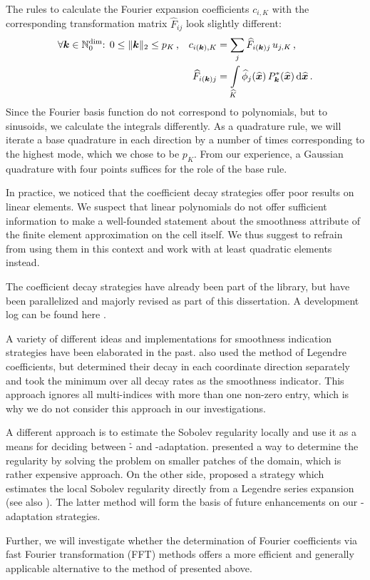 The rules to calculate the Fourier expansion coefficients $c_{i,K}$ with the corresponding transformation matrix $\widehat{F}_{ij}$ look slightly different:
\begin{align}
&\forall \tuple{k} \in \mathbb{N}_0^\text{dim} \text{: } 0 \leq \|\tuple{k}\|_2 \leq p_K \, \text{,} &
c_{i(\tuple{k}),K} &= \sum\limits_j \widehat{F}_{i(\tuple{k})j} \, u_{j,K} \,\text{,} \\
&& \widehat{F}_{i(\tuple{k})j} &= \int\limits_{\widehat{K}} \widehat{\phi}_j(\vec{\widehat{x}}) \, P_\tuple{k}^\ast(\vec{\widehat{x}}) \differential{\vec{\widehat{x}}} \,\text{.}
\end{align}
Since the Fourier basis function do not correspond to polynomials, but to sinusoids, we calculate the integrals differently. As a quadrature rule, we will iterate a base quadrature in each direction by a number of times corresponding to the highest mode, which we chose to be $p_K$. From our experience, a Gaussian quadrature with four points suffices for the role of the base rule.

In practice, we noticed that the coefficient decay strategies offer poor results on linear elements. We suspect that linear polynomials do not offer sufficient information to make a well-founded statement about the smoothness attribute of the finite element approximation on the cell itself. We thus suggest to refrain from using them in this context and work with at least quadratic elements instead.

The coefficient decay strategies have already been part of the \dealii{} library, but have been parallelized and majorly revised as part of this dissertation. A development log can be found here \textcite{dealiipr7513}.

A variety of different ideas and implementations for smoothness indication strategies have been elaborated in the past. \textcite{davydov2017} also used the method of Legendre coefficients, but determined their decay in each coordinate direction separately and took the minimum over all decay rates as the smoothness indicator. This approach ignores all multi-indices with more than one non-zero entry, which is why we do not consider this approach in our investigations.

A different approach is to estimate the Sobolev regularity locally and use it as a means for deciding between \h- and \p-adaptation. \textcite{ainsworth1998} presented a way to determine the regularity by solving the problem on smaller patches of the domain, which is rather expensive approach. On the other side, \textcite{houston2003} proposed a strategy which estimates the local Sobolev regularity directly from a Legendre series expansion (see also \textcite[Sec.~2.4]{houston2005}). The latter method will form the basis of future enhancements on our \hp-adaptation strategies.

Further, we will investigate whether the determination of Fourier coefficients via fast Fourier transformation (FFT) methods  offers a more efficient and generally applicable alternative to the method of \textcite{bangerth2009} presented above.